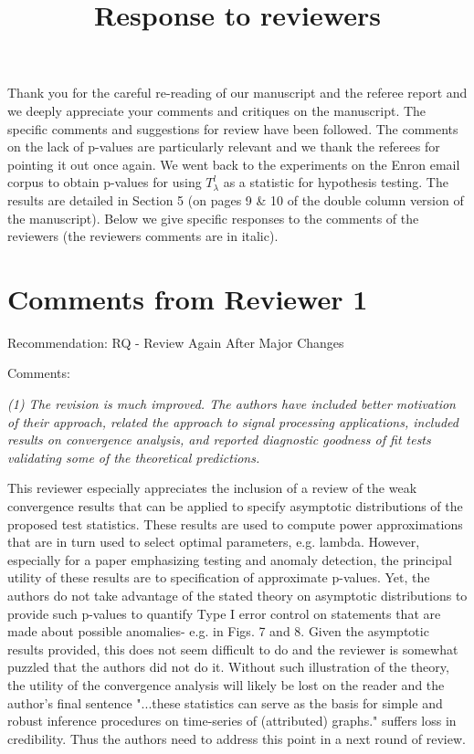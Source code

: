 \documentclass{article}
\begin{document}
\title{Response to reviewers}
\maketitle
\date{} Thank you for the careful re-reading of our manuscript and the
referee report and we deeply appreciate your comments and critiques on
the manuscript. The specific comments and suggestions for review have
been followed. The
comments on the lack of p-values are particularly relevant and we thank
the referees for pointing it out once again. We went back to the 
experiments on the Enron email corpus to obtain p-values for using
$T_{\lambda}^{l}$ as a statistic for hypothesis testing. The results
are detailed in Section 5 (on pages 9 \& 10 of the double column
version of the manuscript). Below we
give specific responses to the comments of the reviewers (the
reviewers comments are in italic). 
\section{Comments from Reviewer 1}
Recommendation: RQ - Review Again After Major Changes

Comments: 
{\em (1) The revision is much improved. The authors have included
better motivation of their approach, related the approach to signal
processing applications, included results on convergence analysis, and
reported diagnostic goodness of fit tests validating some of the
theoretical predictions.

This reviewer especially appreciates the inclusion of a review of the
weak convergence results that can be applied to specify asymptotic
distributions of the proposed test statistics.  These results are used
to compute power approximations that are in turn used to select
optimal parameters, e.g. lambda.  However, especially for a paper
emphasizing testing and anomaly detection, the principal utility of
these results are to specification of approximate p-values. Yet, the
authors do not take advantage of the stated theory on asymptotic
distributions to provide such p-values to quantify Type I error
control on statements that are made about possible anomalies- e.g. in
Figs. 7 and 8. Given the asymptotic results provided, this does not
seem difficult to do and the reviewer is somewhat puzzled that the
authors did not do it. Without such illustration of the theory, the
utility of the convergence analysis will likely be lost on the reader
and the author's final sentence "...these statistics can serve as the
basis for simple and robust inference procedures on time-series of
(attributed) graphs." suffers loss in credibility. Thus the authors
need to address this point in a next round of review.
}
\end{document}
